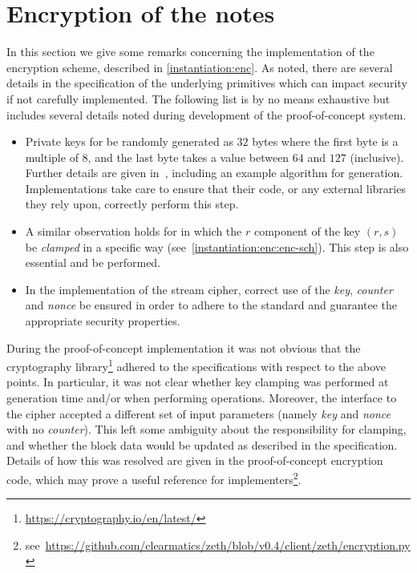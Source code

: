 
\section{Encryption of the notes}\label{implementation:encryption}

In this section we give some remarks concerning the implementation of the \zeth{} encryption scheme, described in \cref{instantiation:enc}. As noted, there are several details in the specification of the underlying primitives which can impact security if not carefully implemented. The following list is by no means exhaustive but includes several details noted during development of the proof-of-concept system.

\begin{itemize}
    \item Private keys for  \MUST{} be randomly generated as $32$ bytes where the first byte is a multiple of $8$, and the last byte takes a value between $64$ and $127$ (inclusive). Further details are given in~\cite{bernstein2006curve25519}, including an example algorithm for generation. Implementations \MUST{} take care to ensure that their code, or any external libraries they rely upon, correctly perform this step.
    \item A similar observation holds for  in which the $r$ component of the \mac{} key $(r, s)$ \MUST{} be \emph{clamped} in a specific way (see~\cref{instantiation:enc:enc-sch}). This step is also essential and \MUST{} be performed.
    \item In the implementation of the \chacha{} stream cipher, correct use of the \emph{key}, \emph{counter} and \emph{nonce} \MUST{} be ensured in order to adhere to the standard and guarantee the appropriate security properties.
\end{itemize}

During the proof-of-concept implementation it was not obvious that the cryptography library\footnote{\url{https://cryptography.io/en/latest/}} adhered to the specifications with respect to the above points. In particular, it was not clear whether key clamping was performed at generation time and/or when performing operations. Moreover, the interface to the \chacha{} cipher accepted a different set of input parameters (namely \emph{key} and \emph{nonce} with no \emph{counter}). This left some ambiguity about the responsibility for clamping, and whether the \chacha{} block data would be updated as described in the specification. Details of how this was resolved are given in the proof-of-concept encryption code, which may prove a useful reference for implementers\footnote{see~\url{https://github.com/clearmatics/zeth/blob/v0.4/client/zeth/encryption.py}}.
